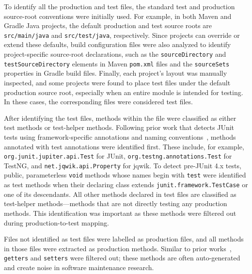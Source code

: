 To identify all the production and test files, the standard test and production source-root conventions were initially used. For example, in both Maven and Gradle Java projects, the default production and test source roots are \texttt{src/main/java} and \texttt{src/test/java}, respectively. Since projects can override or extend these defaults, build configuration files were also analyzed to identify project-specific source-root declarations, such as the \texttt{sourceDirectory} and \texttt{testSourceDirectory} elements in Maven \texttt{pom.xml} files and the \texttt{sourceSets} properties in Gradle build files. Finally, each project's layout was manually inspected, and some projects were found to place test files under the default production source root, especially when an entire module is intended for testing. In these cases, the corresponding files were considered test files.

After identifying the test files, methods within the file were classified as either test methods or test-helper methods. Following prior work that detects JUnit tests using framework-specific annotations and naming conventions~\cite{zaidman2011studying,tufano2022methods2test}, methods annotated with test annotations were identified first. These include, for example, \texttt{org.junit.jupiter.api.Test} for JUnit, \texttt{org.testng.annotations.Test} for TestNG, and \texttt{net.jqwik.api.Property} for jqwik. To detect pre-JUnit 4.x tests, public, parameterless \texttt{void} methods whose names begin with \texttt{test} were identified as test methods when their declaring class extends \texttt{junit.framework\allowbreak.TestCase} or one of its descendants. All other methods declared in test files are classified as test-helper methods---methods that are not directly testing any production methods. This identification was important as these methods were filtered out during production-to-test mapping.

Files not identified as test files were labelled as production files, and all methods in those files were extracted as production methods. Similar to prior works~\cite{Heitlager:2007, Fontana:2015, chowdhury2022empirical}, \texttt{getters} and \texttt{setters} were filtered out; these methods are often auto-generated and create noise in software maintenance research.
